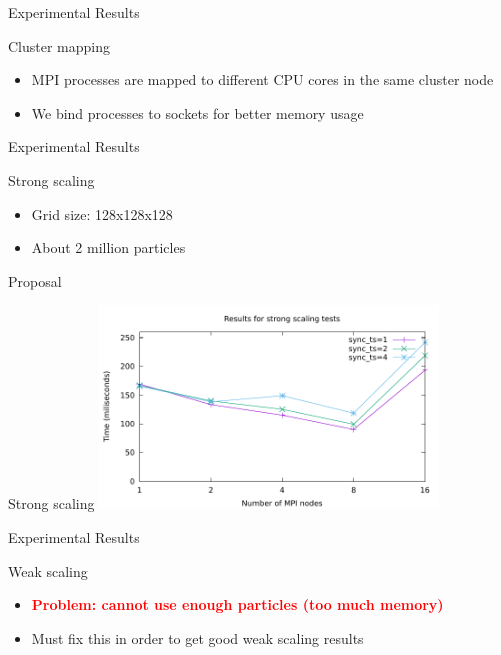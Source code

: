 \documentclass[aspectratio=43,t]{beamer}
\begin{document}
  \begin{frame}{Experimental Results}
    \begin{block}{Cluster mapping}
      \begin{itemize}
        \item MPI processes are mapped to different CPU cores in the same cluster node
        \item We bind processes to sockets for better memory usage
      \end{itemize}
    \end{block}
  \end{frame}

  \begin{frame}{Experimental Results}
    \begin{block}{Strong scaling}
      \begin{itemize}
        \item Grid size: 128x128x128
        \item About 2 million particles
      \end{itemize}
    \end{block}
  \end{frame}

  \begin{frame}{Proposal}
    \begin{block}{Strong scaling}
      \includegraphics[width=9cm]{results/strong_scaling.pdf}
    \end{block}
  \end{frame}

  \begin{frame}{Experimental Results}
    \begin{block}{Weak scaling}
      \begin{itemize}
        \item \textcolor{red}{\textbf{Problem: cannot use enough particles (too much memory)}}
        \item Must fix this in order to get good weak scaling results
      \end{itemize}
    \end{block}
  \end{frame}
\end{document}
